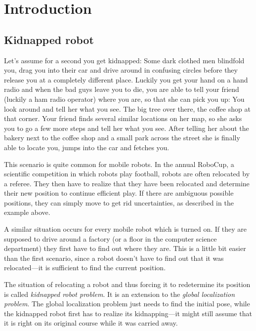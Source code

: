 \documentclass[Thesis.tex]{subfiles}
\begin{document}
\chapter{Introduction}

\section{Kidnapped robot}

Let's assume for a second you get kidnapped: Some dark clothed men blindfold you, drag you into their car and drive around in confusing circles before they release you at a completely different place. Luckily you get your hand on a hand radio and when the bad guys leave you to die, you are able to tell your friend (luckily a ham radio operator) where you are, so that she can pick you up: You look around and tell her what you see. The big tree over there, the coffee shop at that corner. Your friend finds several similar locations on her map, so she asks you to go a few more steps and tell her what you see. After telling her about the bakery next to the coffee shop and a small park across the street she is finally able to locate you, jumps into the car and fetches you.

This scenario is quite common for mobile robots. In the annual RoboCup, a scientific competition in which robots play football\cite[]{robocup}, robots are often relocated by a referee\cite[p.~259]{ThrunBurgardFox:2005}. They then have to realize that they have been relocated and determine their new position to continue efficient play. If there are ambiguous possible positions, they can simply move to get rid uncertainties, as described in the example above.

A similar situation occurs for every mobile robot which is turned on. If they are supposed to drive around a factory (or a floor in the computer science department) they first have to find out where they are. This is a little bit easier than the first scenario, since a robot doesn't have to find out that it was relocated---it is sufficient to find the current position.

The situation of relocating a robot and thus forcing it to redetermine its position is called \emph{kidnapped robot problem}\cite[p.~194]{ThrunBurgardFox:2005}. It is an extension to the \emph{global localization problem}. The global localization problem just needs to find the initial pose, while the kidnapped robot first has to realize its kidnapping---it might still assume that it is right on its original course while it was carried away.
\end{document}
